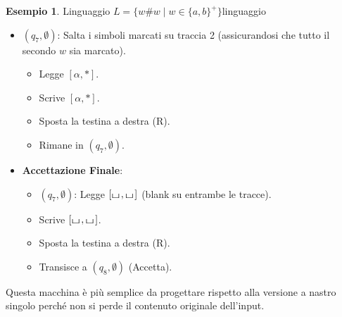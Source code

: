 \documentclass[a4paper]{article}
\theoremstyle{definition} %
\newtheorem{example}{Esempio}
\newcommand{\blankS}{\ensuremath{\raisebox{-0.15ex}{\scalebox{1.3}[0.7]{$\sqcup$}}\mkern2mu}}
\begin{document}
\begin{example}{Linguaggio $L = \{w\#w \mid w \in \{a,b\}^+\}$}{linguaggio}
\begin{itemize}
\begin{itemize}
\begin{itemize}
\begin{itemize}
                            \item Transisce a $(q_7, \emptyset)$.
                        \end{itemize}
                    \item $(q_7, \emptyset)$: Salta i simboli marcati su traccia 2 (assicurandosi che tutto il secondo $w$ sia marcato).
                        \begin{itemize}
                            \item Legge $[\alpha, *]$.
                            \item Scrive $[\alpha, *]$.
                            \item Sposta la testina a destra (R).
                            \item Rimane in $(q_7, \emptyset)$.
                        \end{itemize}
                    \item \textbf{Accettazione Finale}:
                        \begin{itemize}
                            \item $(q_7, \emptyset)$: Legge $[\blankS, \blankS]$ (blank su entrambe le tracce).
                            \item Scrive $[\blankS, \blankS]$.
                            \item Sposta la testina a destra (R).
                            \item Transisce a $(q_8, \emptyset)$ (Accetta).
                        \end{itemize}
                \end{itemize}
        \end{itemize}
\end{itemize}
Questa macchina è più semplice da progettare rispetto alla versione a nastro singolo perché non si perde il contenuto originale dell'input.
\end{example}
\end{document}
